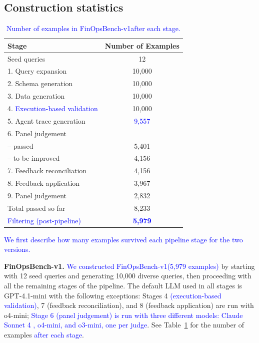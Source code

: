 \documentclass[11pt]{article}
\newcommand{\edit}[1]{\textcolor{blue}{#1}}
\newcommand{\editN}[1]{\textcolor{editgreen}{#1}}
\newcommand{\synthsubset}{FinOpsBench-v1}\xspace
\begin{document}
\subsection{Construction statistics}

\begin{table}[t]
\centering
\small
\begin{tabular}{lc}
\toprule
\textbf{Stage} & \textbf{Number of Examples} \\
\midrule
Seed queries & 12 \\
1. Query expansion & 10,000 \\
2. Schema generation & 10,000 \\
3. Data generation & 10,000 \\
4. \edit{Execution-based validation} & 10,000 \\
5. Agent trace generation & \edit{9,557} \\
6. \editN{Panel} judgement & \\
\quad -- passed & 5,401 \\
\quad -- to be improved & 4,156 \\
7. Feedback reconciliation & 4,156 \\
8. Feedback application & 3,967 \\
9. \editN{Panel} judgement & 2,832 \\
\midrule
Total passed so far & 8,233 \\
\edit{Filtering (post-pipeline)} & \textbf{\edit{5,979}} \\
\bottomrule
\end{tabular}
\caption{\edit{Number of examples in \synthsubset after each stage.}}
\label{tab:synthsubset_numbers}
\end{table}

\edit{We first describe how many examples survived each pipeline stage for the two versions.}

\noindent \textbf{\synthsubset.} \edit{We constructed \synthsubset (5,979 examples)} by starting with 12 seed queries and generating 10,000 diverse queries, then proceeding with all the remaining stages of the pipeline. The default LLM used in all stages is GPT-4.1-mini with the following exceptions: Stages 4 \edit{(execution-based validation)}, 7 (feedback reconciliation), and 8 (feedback application) are run with o4-mini; \edit{Stage 6 
\editN{(panel judgement) }
is run with three different models: Claude Sonnet 4 \editN{\citep{anthropic2025claude4}}, o4-mini, and o3-mini, one per judge}. See Table~\ref{tab:synthsubset_numbers} for the number of examples \edit{after each stage}.
\end{document}

